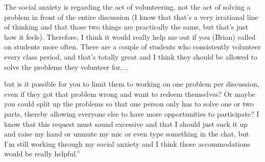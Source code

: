 \documentclass[11pt]{beamer}
\begin{document}
\begin{frame}
  The social anxiety is regarding the act of volunteering, not
  the act of solving a problem in front of the entire discussion (I know that that's a very
  irrational line of thinking and that those two things are practically the same, but that's
  just how it feels). Therefore, I think it would really help me out if you (Brian) called
  on students more often. There are a couple of students who consistently volunteer
  every class period, and that's totally great and I think they should be allowed to solve
  the problems they volunteer for,...
\end{frame}

\begin{frame}
  but is it possible for you to limit them to working on
  one problem per discussion, even if they got that problem wrong and want to redeem
  themselves? Or maybe you could split up the problems so that one person only has to
  solve one or two parts, thereby allowing everyone else to have more opportunities to
  participate? I know that this request must sound excessive and that I should just suck
  it up and raise my hand or unmute my mic or even type something in the chat, but I'm
  still working through my social anxiety and I think those accommodations would be
  really helpful.''
\end{frame}
\end{document}
